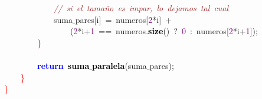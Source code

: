 \mbox{}\ \ \ \ \ \ \ \ \ \ \ \ \textit{\textcolor{Brown}{//\ si\ el\ tamaño\ es\ impar,\ lo\ dejamos\ tal\ cual}} \\
\mbox{}\ \ \ \ \ \ \ \ \ \ \ \ suma$\_$pares\textcolor{BrickRed}{[}i\textcolor{BrickRed}{]}\ \textcolor{BrickRed}{=}\ numeros\textcolor{BrickRed}{[}\textcolor{Purple}{2}\textcolor{BrickRed}{*}i\textcolor{BrickRed}{]}\ \textcolor{BrickRed}{+}\  \\
\mbox{}\ \ \ \ \ \ \ \ \ \ \ \ \ \ \ \ \textcolor{BrickRed}{(}\textcolor{Purple}{2}\textcolor{BrickRed}{*}i\textcolor{BrickRed}{+}\textcolor{Purple}{1}\ \textcolor{BrickRed}{==}\ numeros\textcolor{BrickRed}{.}\textbf{\textcolor{Black}{size}}\textcolor{BrickRed}{()}\ \textcolor{BrickRed}{?}\ \textcolor{Purple}{0}\ \textcolor{BrickRed}{:}\ numeros\textcolor{BrickRed}{[}\textcolor{Purple}{2}\textcolor{BrickRed}{*}i\textcolor{BrickRed}{+}\textcolor{Purple}{1}\textcolor{BrickRed}{]);} \\
\mbox{}\ \ \ \ \ \ \ \ \textcolor{Red}{\}} \\
\mbox{} \\
\mbox{}\ \ \ \ \ \ \ \ \textbf{\textcolor{Blue}{return}}\ \textbf{\textcolor{Black}{suma$\_$paralela}}\textcolor{BrickRed}{(}suma$\_$pares\textcolor{BrickRed}{);} \\
\mbox{}\ \ \ \ \textcolor{Red}{\}} \\
\mbox{}\textcolor{Red}{\}} \\
\mbox{} \\
\mbox{}
